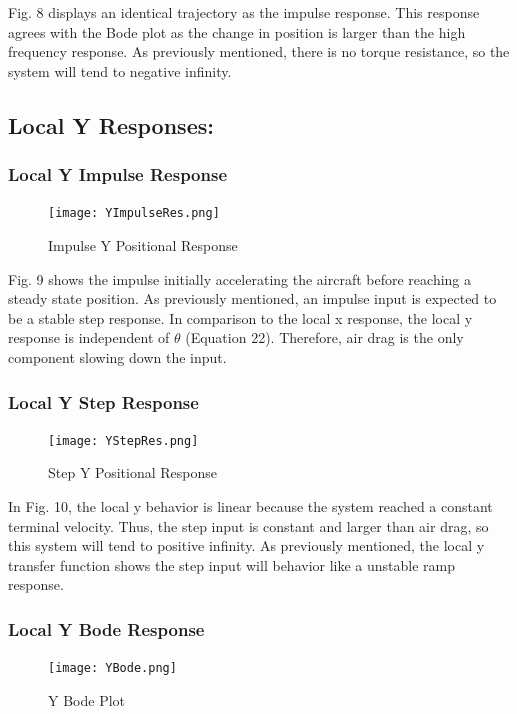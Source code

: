 \documentclass[conference]{IEEEtran}
\begin{document}
Fig. 8 displays an identical trajectory as the impulse response. This response agrees with the Bode plot as the change in position is larger than the high frequency response. As previously mentioned, there is no torque resistance, so the system will tend to negative infinity. \\

\newpage
\subsection{Local Y Responses:}
\subsubsection{Local Y Impulse Response} 
\begin{figure}[htbp]
\centerline{\texttt{[image: YImpulseRes.png]}}
\caption{Impulse Y Positional Response}
\label{figure}
\end{figure}

Fig. 9 shows the impulse initially accelerating the aircraft before reaching a steady state position. As previously mentioned, an impulse input is expected to be a stable step response. In comparison to the local x response, the local y response is independent of $\theta$ (Equation 22). Therefore, air drag is the only component slowing down the input. \\


\subsubsection{Local Y Step Response} 
\begin{figure}[htbp]
\centerline{\texttt{[image: YStepRes.png]}}
\caption{Step Y Positional Response}
\label{figure}
\end{figure}

In Fig. 10, the local y behavior is linear because the system reached a constant terminal velocity. Thus, the step input is constant and larger than air drag, so this system will tend to positive infinity. As previously mentioned, the local y transfer function shows the step input will behavior like a unstable ramp response. 

\newpage
\subsubsection{Local Y Bode Response} 
\begin{figure}[htbp]
\centerline{\texttt{[image: YBode.png]}}
\caption{Y Bode Plot}
\label{figure}
\end{figure}
\end{document}
